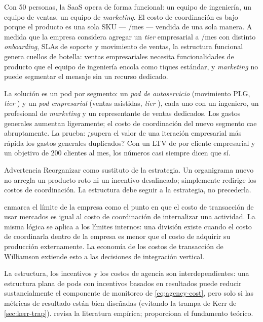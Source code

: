 \begin{example}
Con 50 personas, la SaaS opera de forma funcional: un equipo de ingeniería, un equipo de ventas, un equipo de \emph{marketing}. El costo de coordinación es bajo porque el producto es una sola SKU --- /mes --- vendida de una sola manera. A medida que la empresa considera agregar un \emph{tier} empresarial a /mes con distinto \emph{onboarding}, SLAs de soporte y movimiento de ventas, la estructura funcional genera cuellos de botella: ventas empresariales necesita funcionalidades de producto que el equipo de ingeniería encola como tiques estándar, y \emph{marketing} no puede segmentar el mensaje sin un recurso dedicado.

La solución es un pod por segmento: un \emph{pod de autoservicio} (movimiento PLG, \emph{tier} ) y un \emph{pod empresarial} (ventas asistidas, \emph{tier} ), cada uno con un ingeniero, un profesional de \emph{marketing} y un representante de ventas dedicados. Los gastos generales aumentan ligeramente; el costo de coordinación del nuevo segmento cae abruptamente. La prueba: ¿supera el valor de una iteración empresarial más rápida los gastos generales duplicados? Con un LTV de  por cliente empresarial y un objetivo de \num{200} clientes al mes, los números casi siempre dicen que sí.
\end{example}

\begin{admonition}{Advertencia}
Reorganizar como sustituto de la estrategia. Un organigrama nuevo no arregla un producto roto ni un incentivo desalineado; simplemente redirige los costos de coordinación. La estructura debe seguir a la estrategia, no precederla.
\end{admonition}

\textcite{coase1937nature} enmarca el límite de la empresa como el punto en que el costo de transacción de usar mercados es igual al costo de coordinación de internalizar una actividad. La misma lógica se aplica a los límites internos: una división existe cuando el costo de coordinarla dentro de la empresa es menor que el costo de adquirir su producción externamente. La economía de los costos de transacción de Williamson extiende esto a las decisiones de integración vertical.

La estructura, los incentivos y los costos de agencia son interdependientes: una estructura plana de pods con incentivos basados en resultados puede reducir sustancialmente el componente de monitoreo de \cref{eq:agency-cost}, pero solo si las métricas de resultado están bien diseñadas (evitando la trampa de Kerr de \cref{sec:kerr-trap}). \textcite{robbins2022} revisa la literatura empírica; \textcite{coase1937nature} proporciona el fundamento teórico.

